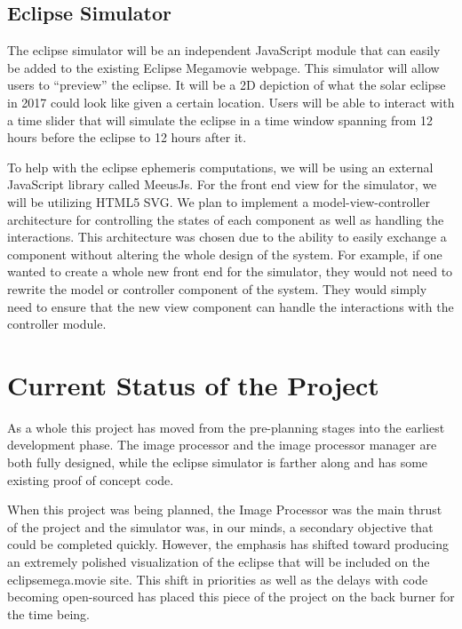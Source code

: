 \documentclass[10pt, onecolumn, draftclsnofoot, letterpaper, compsoc]{IEEEtran}
\begin{document}
\subsection{Eclipse Simulator}

The eclipse simulator will be an independent JavaScript module that can easily
be added to the existing Eclipse Megamovie webpage. This simulator will allow
users to “preview” the eclipse. It will be a 2D depiction of what the solar
eclipse in 2017 could look like given a certain location. Users will be able
to interact with a time slider that will simulate the eclipse in a time
window spanning from 12 hours before the eclipse to 12 hours after it.

To help with the eclipse ephemeris computations, we will be using an external
JavaScript library called MeeusJs. For the front end view for the simulator,
we will be utilizing HTML5 SVG. We plan to implement a model-view-controller
architecture for controlling the states of each component as well as handling
the interactions. This architecture was chosen due to the ability to easily
exchange a component without altering the whole design of the system. For
example, if one wanted to create a whole new front end for the simulator,
they would not need to rewrite the model or controller component of the system.
They would simply need to ensure that the new view component can handle the
interactions with the controller module.


\section{Current Status of the Project}

As a whole this project has moved from the pre-planning stages into the earliest
development phase. The image processor and the image processor manager are both
fully designed, while the eclipse simulator is farther along and has some existing proof of
concept code.

When this project was being planned,
the Image Processor was the main thrust of the project and the simulator was, in
our minds, a secondary objective that could be completed quickly. However, the
emphasis has shifted toward producing an extremely polished visualization of the
eclipse that will be included on the eclipsemega.movie site. This shift in
priorities as well as the delays with code becoming open-sourced has placed this
piece of the project on the back burner for the time being.
\end{document}

